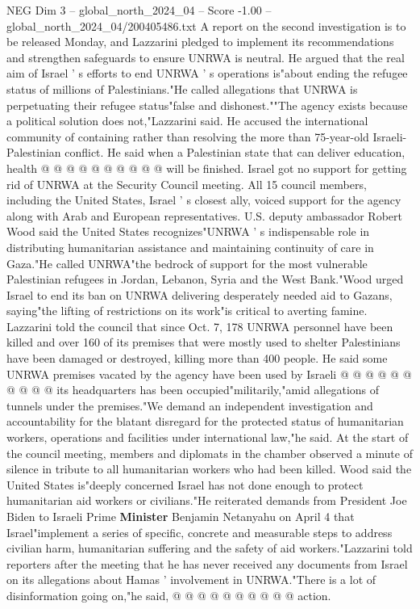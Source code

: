 \begin{textsample}{NEG Dim 3 – global\_north\_2024\_04 – Score -1.00 – global\_north\_2024\_04/200405486.txt}
A report on the second investigation is to be released Monday, and Lazzarini pledged to implement its recommendations and strengthen safeguards to ensure UNRWA is neutral.
He argued that the real aim of Israel ' s efforts to end UNRWA ' s operations is"about ending the refugee status of millions of Palestinians."He called allegations that UNRWA is perpetuating their refugee status"false and dishonest.""The agency exists because a political solution does not,"Lazzarini said.
He accused the international community of containing rather than resolving the more than 75-year-old Israeli-Palestinian conflict.
He said when a Palestinian state that can deliver education, health @ @ @ @ @ @ @ @ @ @ will be finished.
Israel got no support for getting rid of UNRWA at the Security Council meeting.
All 15 council members, including the United States, Israel ' s closest ally, voiced support for the agency along with Arab and European representatives.
U.S. deputy ambassador Robert Wood said the United States recognizes"UNRWA ' s indispensable role in distributing humanitarian assistance and maintaining continuity of care in Gaza."He called UNRWA"the bedrock of support for the most vulnerable Palestinian refugees in Jordan, Lebanon, Syria and the West Bank."Wood urged Israel to end its ban on UNRWA delivering desperately needed aid to Gazans, saying"the lifting of restrictions on its work"is critical to averting famine.
Lazzarini told the council that since Oct. 7, 178 UNRWA personnel have been killed and over 160 of its premises that were mostly used to shelter Palestinians have been damaged or destroyed, killing more than 400 people.
He said some UNRWA premises vacated by the agency have been used by Israeli @ @ @ @ @ @ @ @ @ @ its headquarters has been occupied"militarily,"amid allegations of tunnels under the premises."We demand an independent investigation and accountability for the blatant disregard for the protected status of humanitarian workers, operations and facilities under international law,"he said.
At the start of the council meeting, members and diplomats in the chamber observed a minute of silence in tribute to all humanitarian workers who had been killed.
Wood said the United States is"deeply concerned Israel has not done enough to protect humanitarian aid workers or civilians."He reiterated demands from President Joe Biden to Israeli Prime \textbf{Minister} Benjamin Netanyahu on April 4 that Israel"implement a series of specific, concrete and measurable steps to address civilian harm, humanitarian suffering and the safety of aid workers."Lazzarini told reporters after the meeting that he has never received any documents from Israel on its allegations about Hamas ' involvement in UNRWA."There is a lot of disinformation going on,"he said, @ @ @ @ @ @ @ @ @ @ action.

\end{textsample}

